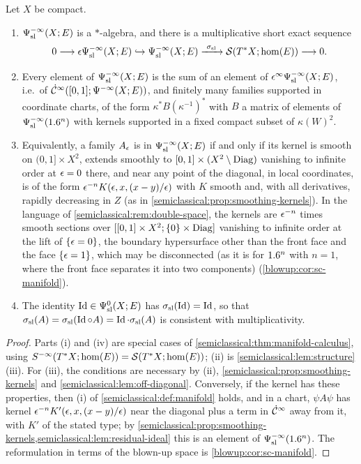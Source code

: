 \begin{proposition}\label{semiclassical:prop:smoothing-X}
  Let $X$ be compact.
  \begin{enumerate}[label=\textup{(\roman*)}]
  \item $\Psi^{-\infty}_{\mathrm{sl}}(X;E)$ is a $*$-algebra, and there is a multiplicative short
    exact sequence
    \begin{equation*}
      0\longrightarrow\epsilon\Psi^{-\infty}_{\mathrm{sl}}(X;E)\hookrightarrow\Psi^{-\infty}_{\mathrm{sl}}(X;E)
      \xrightarrow{\ \sigma_{\mathrm{sl}}\ }\mathcal{S}(T^*X;\hom(E))\longrightarrow0 .
    \end{equation*}
  \item Every element of $\Psi^{-\infty}_{\mathrm{sl}}(X;E)$ is the sum of an element of
    $\epsilon^\infty\Psi^{-\infty}_{\mathrm{sl}}(X;E)$, i.e.\ of $\dot{\mathcal{C}}^\infty([0,1];\Psi^{-\infty}(X;E))$, and finitely many
    families supported in coordinate charts, of the form
    $\kappa^*B(\kappa^{-1})^*$ with $B$ a matrix of elements of $\Psi^{-\infty}_{\mathrm{sl}}(1.6^n)$
    with kernels supported in a fixed compact subset of $\kappa(W)^2$.
  \item Equivalently, a family $A_\epsilon$ is in $\Psi^{-\infty}_{\mathrm{sl}}(X;E)$ if and only if its
    kernel is smooth on $(0,1]\times X^2$, extends smoothly to $[0,1]\times(X^2\setminus\operatorname{Diag})$
    vanishing to infinite order at $\epsilon=0$ there, and near any point of the
    diagonal, in local coordinates, is of the form
    $\epsilon^{-n}K(\epsilon,x,(x-y)/\epsilon)$ with $K$ smooth and, with all derivatives,
    rapidly decreasing in $Z$ (as in \cref{semiclassical:prop:smoothing-kernels}). In
    the language of \cref{semiclassical:rem:double-space}, the kernels are $\epsilon^{-n}$
    times smooth sections over $[[0,1]\times X^2;\{0\}\times\operatorname{Diag}]$ vanishing to
    infinite order at the lift of $\{\epsilon=0\}$, the boundary hypersurface other than the front
    face and the face $\{\epsilon=1\}$, which may be disconnected (as it is for $1.6^n$ with
    $n=1$, where the front face separates it into two components) (\cref{blowup:cor:sc-manifold}).
  \item The identity $\operatorname{Id}\in\Psi^{0}_{\mathrm{sl}}(X;E)$ has $\sigma_{\mathrm{sl}}(\operatorname{Id})=\operatorname{Id}$, so that
    $\sigma_{\mathrm{sl}}(A)=\sigma_{\mathrm{sl}}(\operatorname{Id}\circ A)=\operatorname{Id}\cdot\sigma_{\mathrm{sl}}(A)$ is consistent with multiplicativity.
  \end{enumerate}
\end{proposition}
\begin{proof}
  Parts (i) and (iv) are special cases of
  \cref{semiclassical:thm:manifold-calculus}, using $S^{-\infty}(T^*X;\hom(E))=\mathcal{S}(T^*X;\hom(E))$; (ii) is
  \cref{semiclassical:lem:structure}(iii). For (iii), the conditions are necessary
  by (ii), \cref{semiclassical:prop:smoothing-kernels} and
  \cref{semiclassical:lem:off-diagonal}. Conversely, if the kernel has these
  properties, then (i) of \cref{semiclassical:def:manifold} holds, and in a
  chart, $\psi A\psi$ has kernel $\epsilon^{-n}K'(\epsilon,x,(x-y)/\epsilon)$ near the diagonal
  plus a term in $\dot{\mathcal{C}}^\infty$ away from it, with $K'$ of the stated type; by
  \cref{semiclassical:prop:smoothing-kernels,semiclassical:lem:residual-ideal} this
  is an element of $\Psi^{-\infty}_{\mathrm{sl}}(1.6^n)$. The reformulation in terms of the
  blown-up space is \cref{blowup:cor:sc-manifold}.
\end{proof}

